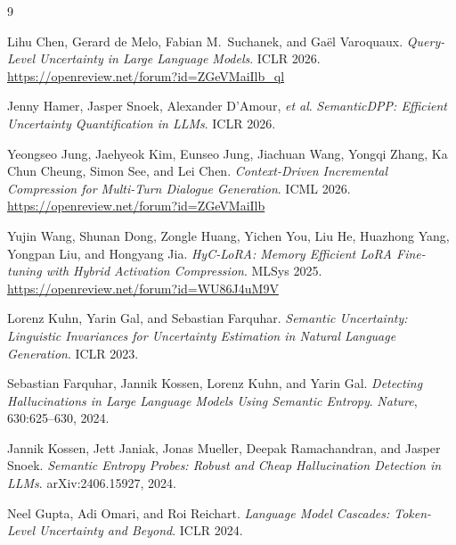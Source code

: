 \documentclass[11pt, a4paper]{article}
\begin{document}
\begin{thebibliography}{9}

Lihu Chen, Gerard de Melo, Fabian M.\ Suchanek, and Gaël Varoquaux.
\textit{Query-Level Uncertainty in Large Language Models}.
ICLR 2026. \url{https://openreview.net/forum?id=ZGeVMaiIlb_ql}

Jenny Hamer, Jasper Snoek, Alexander D'Amour, \textit{et al}.
\textit{SemanticDPP: Efficient Uncertainty Quantification in LLMs}.
ICLR 2026.

Yeongseo Jung, Jaehyeok Kim, Eunseo Jung, Jiachuan Wang, Yongqi Zhang, Ka Chun Cheung, Simon See, and Lei Chen.
\textit{Context-Driven Incremental Compression for Multi-Turn Dialogue Generation}.
ICML 2026. \url{https://openreview.net/forum?id=ZGeVMaiIlb}

Yujin Wang, Shunan Dong, Zongle Huang, Yichen You, Liu He, Huazhong Yang, Yongpan Liu, and Hongyang Jia.
\textit{HyC-LoRA: Memory Efficient LoRA Fine-tuning with Hybrid Activation Compression}.
MLSys 2025. \url{https://openreview.net/forum?id=WU86J4uM9V}

Lorenz Kuhn, Yarin Gal, and Sebastian Farquhar.
\textit{Semantic Uncertainty: Linguistic Invariances for Uncertainty Estimation in Natural Language Generation}.
ICLR 2023.

Sebastian Farquhar, Jannik Kossen, Lorenz Kuhn, and Yarin Gal.
\textit{Detecting Hallucinations in Large Language Models Using Semantic Entropy}.
\textit{Nature}, 630:625--630, 2024.

Jannik Kossen, Jett Janiak, Jonas Mueller, Deepak Ramachandran, and Jasper Snoek.
\textit{Semantic Entropy Probes: Robust and Cheap Hallucination Detection in LLMs}.
arXiv:2406.15927, 2024.

Neel Gupta, Adi Omari, and Roi Reichart.
\textit{Language Model Cascades: Token-Level Uncertainty and Beyond}.
ICLR 2024.

\end{thebibliography}
\end{document}
